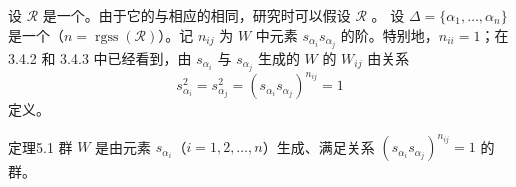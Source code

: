 设 $\mathscr R$ 是一个。由于它的与相应的相同，研究时可以假设 $\mathscr R$ 。
设 $\Delta=\{\alpha_1,\ldots,\alpha_n\}$ 是一个（$n=\operatorname{rgss}(\mathscr R)$）。记 $n_{ij}$ 为 $W$ 中元素 $s_{\alpha_i}s_{\alpha_j}$ 的阶。特别地，$n_{ii}=1$；在 3.4.2 和 3.4.3 中已经看到，由 $s_{\alpha_i}$ 与 $s_{\alpha_j}$ 生成的 $W$ 的 $W_{ij}$ 由关系
\[s_{\alpha_i}^2=s_{\alpha_j}^2=(s_{\alpha_i}s_{\alpha_j})^{n_{ij}}=1\]
定义。
\begin{SGAresult}{定理}{5.1}
群 $W$ 是由元素 $s_{\alpha_i}$（$i=1,2,\ldots,n$）生成、满足关系 $(s_{\alpha_i}s_{\alpha_j})^{n_{ij}}=1$ 的群。
\end{SGAresult}

